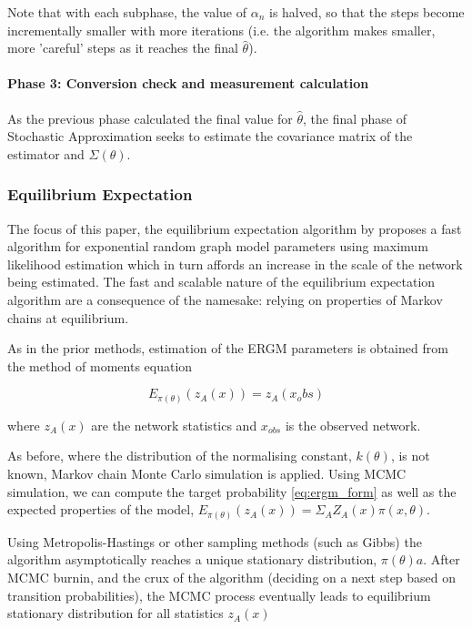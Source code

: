 Note that with each subphase, the value of $\alpha_n$ is halved, so that the steps become incrementally smaller with more iterations (i.e. the algorithm makes smaller, more 'careful' steps as it reaches the final $\hat{\theta}$).

\paragraph{Phase 3: Conversion check and measurement calculation}

As the previous phase calculated the final value for $\hat{\theta}$, the final phase of Stochastic Approximation seeks to estimate the covariance matrix of the estimator and $\Sigma(\theta)$. 


\subsubsection{Equilibrium Expectation}

The focus of this paper, the equilibrium expectation algorithm by \cite{eqexpectation} proposes a fast algorithm for exponential random graph model parameters using maximum likelihood estimation which in turn affords an increase in the scale of the network being estimated. The fast and scalable nature of the equilibrium expectation algorithm are a consequence of the namesake: relying on properties of Markov chains at equilibrium.

As in the prior methods, estimation of the ERGM parameters is obtained from the method of moments equation

\begin{equation}
E_{\pi(\theta)}(z_A(x)) = z_A(x_obs)
\end{equation}

where $z_A(x)$ are the network statistics and $x_{obs}$ is the observed network. 

As before, where the distribution of the normalising constant, $k(\theta)$, is not known, Markov chain Monte Carlo simulation is applied. Using MCMC simulation, we can compute the target probability \ref{eq:ergm_form} as well as the expected properties of the model, $E_{\pi(\theta)}(z_A(x)) = \Sigma_AZ_A(x)\pi(x, \theta)$. 

Using Metropolis-Hastings or other sampling methods (such as Gibbs) the algorithm asymptotically reaches a unique stationary distribution, $\pi(\theta)a$. After MCMC burnin, and the crux of the algorithm (deciding on a next step based on transition probabilities), the MCMC process eventually leads to equilibrium stationary distribution for all statistics $z_A(x)$

